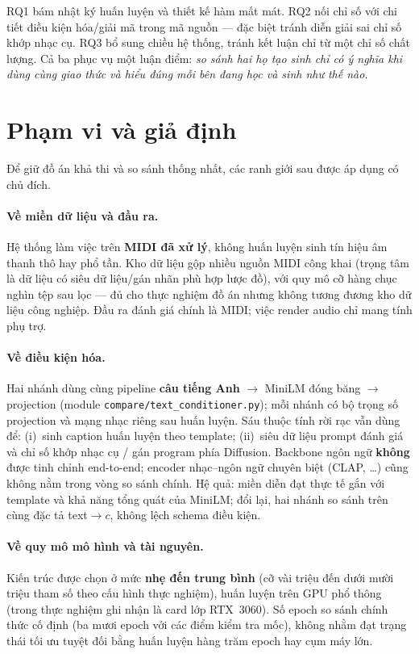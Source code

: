 RQ1 bám nhật ký huấn luyện và thiết kế hàm mất mát. RQ2 nối chỉ số với chi tiết điều kiện hóa/giải mã trong mã nguồn --- đặc biệt tránh diễn giải sai chỉ số khớp nhạc cụ. RQ3 bổ sung chiều hệ thống, tránh kết luận chỉ từ một chỉ số chất lượng. Cả ba phục vụ một luận điểm: \textit{so sánh hai họ tạo sinh chỉ có ý nghĩa khi dùng cùng giao thức và hiểu đúng mỗi bên đang học và sinh như thế nào}.

\section{Phạm vi và giả định}
\label{sec:ch1-scope}

Để giữ đồ án khả thi và so sánh thống nhất, các ranh giới sau được áp dụng có chủ đích.

\paragraph{Về miền dữ liệu và đầu ra.}
Hệ thống làm việc trên \textbf{MIDI đã xử lý}, không huấn luyện sinh tín hiệu âm thanh thô hay phổ tần. Kho dữ liệu gộp nhiều nguồn MIDI công khai (trọng tâm là dữ liệu có siêu dữ liệu/gán nhãn phù hợp lược đồ), với quy mô cỡ hàng chục nghìn tệp sau lọc --- đủ cho thực nghiệm đồ án nhưng không tương đương kho dữ liệu công nghiệp. Đầu ra đánh giá chính là MIDI; việc render audio chỉ mang tính phụ trợ.

\paragraph{Về điều kiện hóa.}
Hai nhánh dùng cùng pipeline \textbf{câu tiếng Anh} $\rightarrow$ MiniLM đóng băng $\rightarrow$ projection (module \texttt{compare/text\_conditioner.py}); mỗi nhánh có bộ trọng số projection và mạng nhạc riêng sau huấn luyện. Sáu thuộc tính rời rạc vẫn dùng để: (i)~sinh caption huấn luyện theo template; (ii)~siêu dữ liệu prompt đánh giá và chỉ số khớp nhạc cụ / gán program phía Diffusion. Backbone ngôn ngữ \textbf{không} được tinh chỉnh end-to-end; encoder nhạc--ngôn ngữ chuyên biệt (CLAP, \ldots) cũng không nằm trong vòng so sánh chính. Hệ quả: miền diễn đạt thực tế gắn với template và khả năng tổng quát của MiniLM; đổi lại, hai nhánh so sánh trên cùng đặc tả text$\rightarrow c$, không lệch schema điều kiện.

\paragraph{Về quy mô mô hình và tài nguyên.}
Kiến trúc được chọn ở mức \textbf{nhẹ đến trung bình} (cỡ vài triệu đến dưới mười triệu tham số theo cấu hình thực nghiệm), huấn luyện trên GPU phổ thông (trong thực nghiệm ghi nhận là card lớp RTX~3060). Số epoch so sánh chính thức cố định (ba mươi epoch với các điểm kiểm tra mốc), không nhằm đạt trạng thái tối ưu tuyệt đối bằng huấn luyện hàng trăm epoch hay cụm máy lớn.

